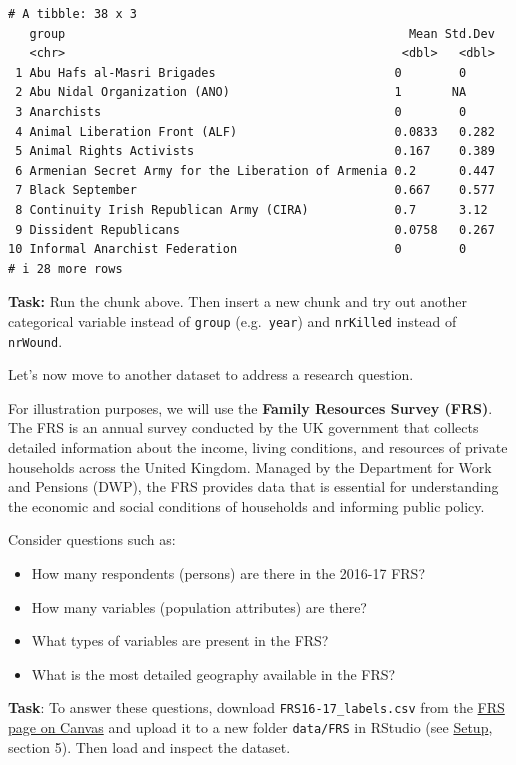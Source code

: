 \documentclass[
  letterpaper,
  DIV=11,
  numbers=noendperiod]{scrreprt}
\providecommand{\tightlist}{%
  \setlength{\itemsep}{0pt}\setlength{\parskip}{0pt}}
\begin{document}
\begin{verbatim}
# A tibble: 38 x 3
   group                                                Mean Std.Dev
   <chr>                                               <dbl>   <dbl>
 1 Abu Hafs al-Masri Brigades                         0        0    
 2 Abu Nidal Organization (ANO)                       1       NA    
 3 Anarchists                                         0        0    
 4 Animal Liberation Front (ALF)                      0.0833   0.282
 5 Animal Rights Activists                            0.167    0.389
 6 Armenian Secret Army for the Liberation of Armenia 0.2      0.447
 7 Black September                                    0.667    0.577
 8 Continuity Irish Republican Army (CIRA)            0.7      3.12 
 9 Dissident Republicans                              0.0758   0.267
10 Informal Anarchist Federation                      0        0    
# i 28 more rows
\end{verbatim}

\textbf{Task:} Run the chunk above. Then insert a new chunk and try out
another categorical variable instead of \texttt{group}
(e.g.~\texttt{year}) and \texttt{nrKilled} instead of \texttt{nrWound}.

Let's now move to another dataset to address a research question.

For illustration purposes, we will use the \textbf{Family Resources
Survey (FRS)}. The FRS is an annual survey conducted by the UK
government that collects detailed information about the income, living
conditions, and resources of private households across the United
Kingdom. Managed by the Department for Work and Pensions (DWP), the FRS
provides data that is essential for understanding the economic and
social conditions of households and informing public policy.

Consider questions such as:

\begin{itemize}
\tightlist
\item
  How many respondents (persons) are there in the 2016-17 FRS?
\item
  How many variables (population attributes) are there?
\item
  What types of variables are present in the FRS?
\item
  What is the most detailed geography available in the FRS?
\end{itemize}

\textbf{Task}: To answer these questions, download
\texttt{FRS16-17\_labels.csv} from the
\href{https://canvas.liverpool.ac.uk/courses/93312/pages/family-resource-survey-2016-17?module_item_id=2727712}{FRS
page on Canvas} and upload it to a new folder \texttt{data/FRS} in
RStudio (see \hyperref[setup-rstudio-in-your-browser]{Setup}, section
5). Then load and inspect the dataset.
\end{document}

